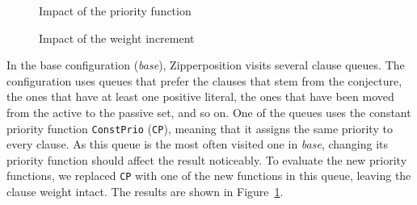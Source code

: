 \begin{figure}[t]
  \centering
  \caption{Impact of the priority function}
  \label{fig:priorities}
\end{figure}
\begin{figure}[t]
  \centering
  \def\arraystretch{1.1}%
  \caption{Impact of the  weight increment \ParamPenaltyIncrease}
  \label{fig:penalties}
\end{figure}

In the base configuration (\emph{base}), Zipperposition visits several clause
queues. The configuration uses queues that prefer the clauses that stem from
the conjecture, the ones that have at least one positive literal, the ones that
have been moved from the active to the passive set, and so on. One of the queues uses the constant
priority function \texttt{ConstPrio} (\texttt{CP}), meaning that it assigns the same
priority to every clause. As this queue is the most often visited one in \emph{base},
changing its priority function should affect the result noticeably.
To evaluate the new priority functions, we replaced
\texttt{CP} with one of the new functions in this queue,
leaving the clause weight intact. The results are shown in Figure~\ref{fig:priorities}.


